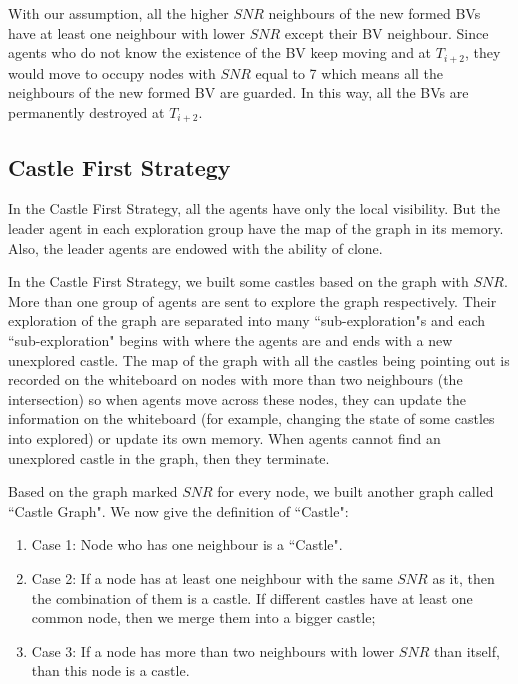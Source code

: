With our assumption, all the higher $SNR$ neighbours of the new formed BVs have at least one neighbour with lower $SNR$ except their BV neighbour.  Since agents who do not know the existence of the BV keep moving and at $T_{i+2}$, they would move to occupy nodes with $SNR$ equal to 7 which means all the neighbours of the new formed BV are guarded. In this way, all the BVs are permanently destroyed at $T_{i+2}$.

               
\subsection{Castle First Strategy}
In the Castle First Strategy, all the agents have only the local visibility. But the leader agent in each exploration group have the map of the graph in its memory. Also, the leader agents are endowed with the ability of clone.

In the Castle First Strategy, we built some castles based on the graph with $SNR$. More than one group of agents are sent to explore the graph respectively. Their exploration of the graph are separated into many ``sub-exploration"s and each ``sub-exploration" begins with where the agents are and ends with a new unexplored castle. The map of the graph with all the castles being pointing out is recorded on the whiteboard on nodes with more than two neighbours (the intersection) so when agents move across these nodes, they can update the information on the whiteboard (for example, changing the state of some castles into explored) or update its own memory. When agents cannot find an unexplored castle in the graph, then they terminate. 

Based on the graph marked $SNR$ for every node, we built another graph called ``Castle Graph". 
We now give the definition of ``Castle":
\begin{enumerate}
\item Case 1: Node who has one neighbour is a ``Castle".
\item Case 2: If a node has at least one neighbour with the same $SNR$ as it, then the combination of them is a castle. If different castles have at least one common node, then we merge them into a bigger castle;
\item Case 3: If a node has more than two neighbours with lower $SNR$ than itself, than this node is a castle.
\end{enumerate}

